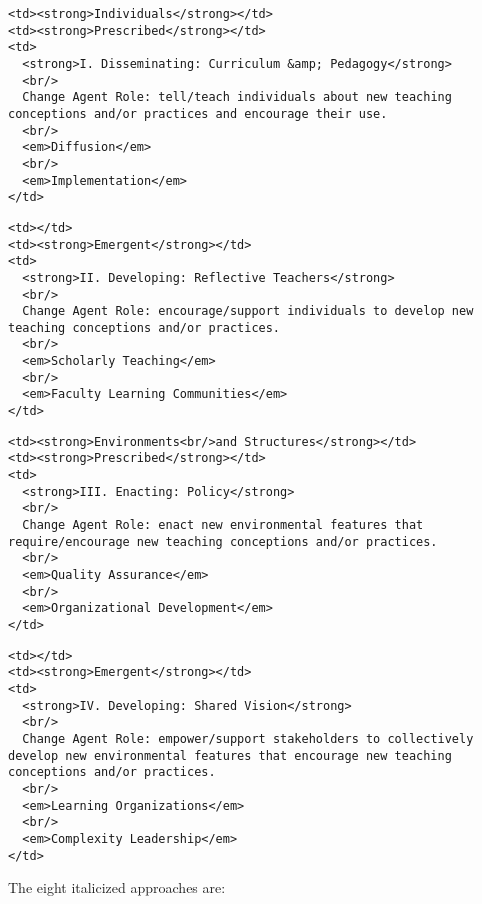 \begin{verbatim}
<td><strong>Individuals</strong></td>
<td><strong>Prescribed</strong></td>
<td>
  <strong>I. Disseminating: Curriculum &amp; Pedagogy</strong>
  <br/>
  Change Agent Role: tell/teach individuals about new teaching conceptions and/or practices and encourage their use.
  <br/>
  <em>Diffusion</em>
  <br/>
  <em>Implementation</em>
</td>
\end{verbatim}

\begin{verbatim}
<td></td>
<td><strong>Emergent</strong></td>
<td>
  <strong>II. Developing: Reflective Teachers</strong>
  <br/>
  Change Agent Role: encourage/support individuals to develop new teaching conceptions and/or practices.
  <br/>
  <em>Scholarly Teaching</em>
  <br/>
  <em>Faculty Learning Communities</em>
</td>
\end{verbatim}

\begin{verbatim}
<td><strong>Environments<br/>and Structures</strong></td>
<td><strong>Prescribed</strong></td>
<td>
  <strong>III. Enacting: Policy</strong>
  <br/>
  Change Agent Role: enact new environmental features that require/encourage new teaching conceptions and/or practices.
  <br/>
  <em>Quality Assurance</em>
  <br/>
  <em>Organizational Development</em>
</td>
\end{verbatim}

\begin{verbatim}
<td></td>
<td><strong>Emergent</strong></td>
<td>
  <strong>IV. Developing: Shared Vision</strong>
  <br/>
  Change Agent Role: empower/support stakeholders to collectively develop new environmental features that encourage new teaching conceptions and/or practices.
  <br/>
  <em>Learning Organizations</em>
  <br/>
  <em>Complexity Leadership</em>
</td>
\end{verbatim}

The eight italicized approaches are:

